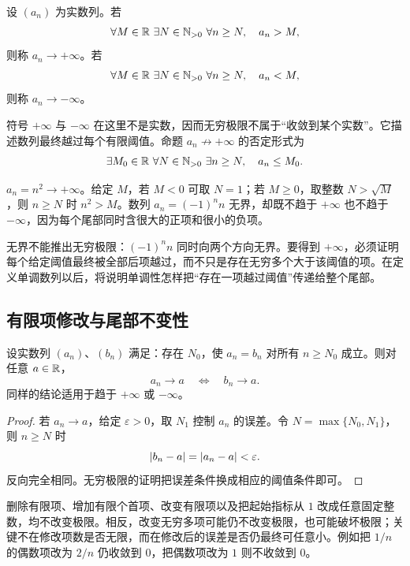 \begin{definition}
设 \((a_n)\) 为实数列。若
\[
\forall M\in\mathbb{R}\ \exists N\in\mathbb{N}_{>0}\ \forall n\ge N,
 \quad a_n>M,
\]
则称 \(a_n\to+\infty\)。若
\[
\forall M\in\mathbb{R}\ \exists N\in\mathbb{N}_{>0}\ \forall n\ge N,
 \quad a_n<M,
\]
则称 \(a_n\to-\infty\)。
\end{definition}

符号 \(+\infty\) 与 \(-\infty\) 在这里不是实数，因而无穷极限不属于“收敛到某个实数”。它描述数列最终越过每个有限阈值。命题 \(a_n\not\to+\infty\) 的否定形式为
\[
\exists M_0\in\mathbb{R}\ \forall N\in\mathbb{N}_{>0}\ \exists n\ge N,
 \quad a_n\le M_0.
\]

\begin{example}
\(a_n=n^2\to+\infty\)。给定 \(M\)，若 \(M<0\) 可取 \(N=1\)；若 \(M\ge0\)，取整数 \(N>\sqrt M\)，则 \(n\ge N\) 时 \(n^2>M\)。数列 \(a_n=(-1)^n n\) 无界，却既不趋于 \(+\infty\) 也不趋于 \(-\infty\)，因为每个尾部同时含很大的正项和很小的负项。
\end{example}

无界不能推出无穷极限：\((-1)^n n\) 同时向两个方向无界。要得到 \(+\infty\)，必须证明每个给定阈值最终被全部后项越过，而不只是存在无穷多个大于该阈值的项。在定义单调数列以后，将说明单调性怎样把“存在一项越过阈值”传递给整个尾部。

\subsection{有限项修改与尾部不变性}

\begin{theorem}[尾部不变性]
设实数列 \((a_n)\)、\((b_n)\) 满足：存在 \(N_0\)，使 \(a_n=b_n\) 对所有 \(n\ge N_0\) 成立。则对任意 \(a\in\mathbb{R}\)，
\[
 a_n\to a\quad\Longleftrightarrow\quad b_n\to a.
\]
同样的结论适用于趋于 \(+\infty\) 或 \(-\infty\)。
\end{theorem}

\begin{proof}
若 \(a_n\to a\)，给定 \(\varepsilon>0\)，取 \(N_1\) 控制 \(a_n\) 的误差。令 \(N=\max\{N_0,N_1\}\)，则 \(n\ge N\) 时
\[
 \left|b_n-a\right|=\left|a_n-a\right|<\varepsilon.
\]
反向完全相同。无穷极限的证明把误差条件换成相应的阈值条件即可。
\end{proof}

删除有限项、增加有限个首项、改变有限项以及把起始指标从 \(1\) 改成任意固定整数，均不改变极限。相反，改变无穷多项可能仍不改变极限，也可能破坏极限；关键不在修改项数是否无限，而在修改后的误差是否仍最终可任意小。例如把 \(1/n\) 的偶数项改为 \(2/n\) 仍收敛到 \(0\)，把偶数项改为 \(1\) 则不收敛到 \(0\)。


